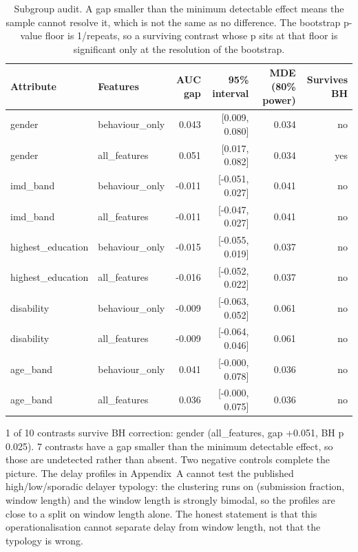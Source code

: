 \documentclass[11pt]{article}
\begin{document}
\begin{table}[t]
\centering
\scriptsize\setlength{\tabcolsep}{3pt}
\begin{tabular}{llrrrr}
\toprule
Attribute & Features & AUC gap & 95\% interval & MDE (80\% power) & Survives BH \\
\midrule
gender & behaviour\_only & 0.043 & [0.009, 0.080] & 0.034 & no \\
gender & all\_features & 0.051 & [0.017, 0.082] & 0.034 & yes \\
imd\_band & behaviour\_only & -0.011 & [-0.051, 0.027] & 0.041 & no \\
imd\_band & all\_features & -0.011 & [-0.047, 0.027] & 0.041 & no \\
highest\_education & behaviour\_only & -0.015 & [-0.055, 0.019] & 0.037 & no \\
highest\_education & all\_features & -0.016 & [-0.052, 0.022] & 0.037 & no \\
disability & behaviour\_only & -0.009 & [-0.063, 0.052] & 0.061 & no \\
disability & all\_features & -0.009 & [-0.064, 0.046] & 0.061 & no \\
age\_band & behaviour\_only & 0.041 & [-0.000, 0.078] & 0.036 & no \\
age\_band & all\_features & 0.036 & [-0.000, 0.075] & 0.036 & no \\
\bottomrule
\end{tabular}
\caption{Subgroup audit. A gap smaller than the minimum detectable effect means the sample cannot resolve it, which is not the same as no difference. The bootstrap p-value floor is 1/repeats, so a surviving contrast whose p sits at that floor is significant only at the resolution of the bootstrap.}
\label{tab:v3}
\end{table}
1 of 10 contrasts survive BH correction: gender (all\_features, gap +0.051, BH p 0.025). 7 contrasts have a gap smaller than the minimum detectable effect, so those are undetected rather than absent.
Two negative controls complete the picture. The delay profiles in Appendix~A cannot test the published high/low/sporadic delayer typology: the clustering runs on (submission fraction, window length) and the window length is strongly bimodal, so the profiles are close to a split on window length alone. The honest statement is that this operationalisation cannot separate delay from window length, not that the typology is wrong.
\end{document}
